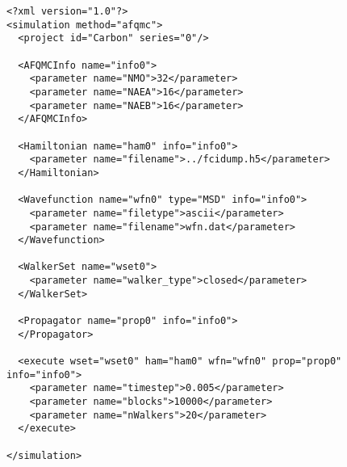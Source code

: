 \begin{lstlisting}[style=QMCPXML,caption=Sample input file for AFQMC.]
<?xml version="1.0"?>
<simulation method="afqmc">
  <project id="Carbon" series="0"/>

  <AFQMCInfo name="info0">
    <parameter name="NMO">32</parameter>
    <parameter name="NAEA">16</parameter>
    <parameter name="NAEB">16</parameter>
  </AFQMCInfo>

  <Hamiltonian name="ham0" info="info0">
    <parameter name="filename">../fcidump.h5</parameter>
  </Hamiltonian>

  <Wavefunction name="wfn0" type="MSD" info="info0">
    <parameter name="filetype">ascii</parameter>
    <parameter name="filename">wfn.dat</parameter>
  </Wavefunction>

  <WalkerSet name="wset0">
    <parameter name="walker_type">closed</parameter> 
  </WalkerSet>

  <Propagator name="prop0" info="info0">
  </Propagator>

  <execute wset="wset0" ham="ham0" wfn="wfn0" prop="prop0" info="info0">
    <parameter name="timestep">0.005</parameter>
    <parameter name="blocks">10000</parameter>
    <parameter name="nWalkers">20</parameter>
  </execute>

</simulation>
\end{lstlisting}

